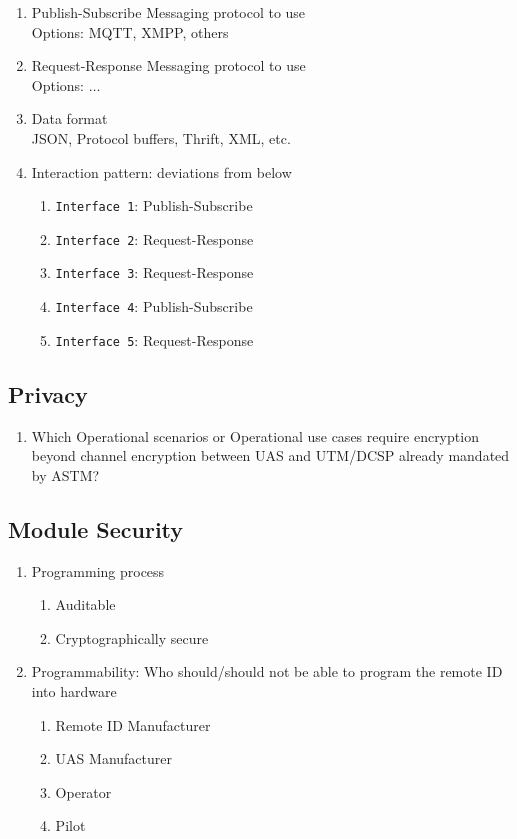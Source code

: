 \documentclass{ua_wgs_questionnaire}
\begin{document}
\begin{Form}[action={http://localhost:8000}, encoding=html, method=post]
\begin{enumerate}
  \item Publish-Subscribe Messaging protocol to use \\
  Options: MQTT, XMPP, others
  \item Request-Response Messaging protocol to use \\
  Options: $\ldots$
  \item Data format \\
  JSON, Protocol buffers, Thrift, XML, etc.
  \item Interaction pattern: deviations from below \\
  \begin{enumerate}
    \item \texttt{Interface 1}: Publish-Subscribe
    \item \texttt{Interface 2}: Request-Response
    \item \texttt{Interface 3}: Request-Response
    \item \texttt{Interface 4}: Publish-Subscribe
    \item \texttt{Interface 5}: Request-Response
  \end{enumerate}
\end{enumerate}

\subsection{Privacy}
\begin{enumerate}
\item Which Operational scenarios or Operational use cases
require encryption beyond channel
encryption between UAS and UTM/DCSP already mandated by ASTM?
\end{enumerate}

\subsection{Module Security}
\begin{enumerate}
\item Programming process 
\begin{enumerate}
\item Auditable
\item Cryptographically secure
\end{enumerate}
\item Programmability: Who should/should not be able to program the remote
ID into hardware
\begin{enumerate}
\item Remote ID Manufacturer
\item UAS Manufacturer
\item Operator
\item Pilot
\end{enumerate}
\end{enumerate}


\end{Form}
\end{document}
